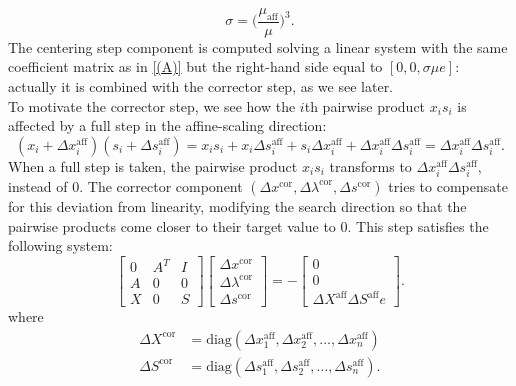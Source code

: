 \documentclass[a4paper,10 pt,titlepage,twoside]{book}
\theoremstyle{plain}
\theoremstyle{definition}
\theoremstyle{remark}
\begin{document}
\begin{equation*}
\sigma = \bigg(\frac{\mu_{\text{aff}}}{\mu}\bigg)^{3}.
\end{equation*}
The centering step component is computed solving a linear system with the same coefficient matrix as in \ref{(A)} but the right-hand side equal to $[0, 0,\sigma\mu e]$: actually it is combined with the corrector step, as we see later.\\
To motivate the corrector step, we see how the $i$th pairwise product $x_{i}s_{i}$ is affected by a full step in the affine-scaling direction:
\begin{equation*}
(x_{i}+\Delta x_{i}^{\text{aff}})(s_{i}+\Delta s_{i}^{\text{aff}})= x_{i}s_{i}+ x_{i}\Delta s_{i}^{\text{aff}}+s_{i}\Delta x_{i}^{\text{aff}}+\Delta x_{i}^{\text{aff}}\Delta s_{i}^{\text{aff}} =\Delta x_{i}^{\text{aff}}\Delta s_{i}^{\text{aff}}.
\end{equation*}
When a full step is taken, the pairwise product $x_{i}s_{i}$ transforms to $\Delta x_{i}^{\text{aff}}\Delta s_{i}^{\text{aff}}$, instead of 0. The corrector component $(\Delta x^{\text{cor}}, \Delta \lambda^{\text{cor}}, \Delta s^{\text{cor}})$ tries to compensate for this deviation from linearity, modifying the search direction so that the pairwise products come closer to their target value to 0. This step satisfies the following system:
\begin{equation}\label{(B)}
\begin{bmatrix}
0&A^{T}&I \\A&0&0\\X&0&S
\end{bmatrix}\begin{bmatrix}
\Delta x^{\text{cor}}\\\Delta\lambda^{\text{cor}} \\\Delta s^{\text{cor}}
\end{bmatrix}=-\begin{bmatrix}
0\\0\\\Delta X^{\text{aff}}\Delta S^{\text{aff}}e
\end{bmatrix}.
\end{equation}
where
\begin{align*}
\Delta X^{\text{cor}}& = \text{diag}(\Delta x_{1}^{\text{aff}}, \Delta x_{2}^{\text{aff}},\dots,\Delta x_{n}^{\text{aff}})\\
\Delta S^{\text{cor}}& = \text{diag}(\Delta s_{1}^{\text{aff}}, \Delta s_{2}^{\text{aff}},\dots,\Delta s_{n}^{\text{aff}}).
\end{align*}
\end{document}
